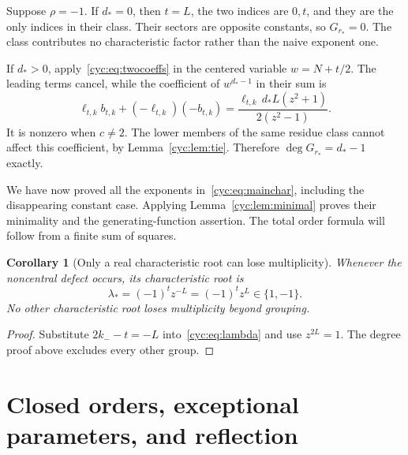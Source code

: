\documentclass[11pt,a4paper]{article}
\numberwithin{equation}{section}
\newtheorem{corollary}[theorem]{Corollary}
\theoremstyle{definition}
\theoremstyle{remark}
\begin{document}
Suppose $\rho=-1$.  If $d_*=0$, then $t=L$, the two indices are
$0,t$, and they are the only indices in their class.  Their sectors
are opposite constants, so $G_{r_*}=0$.  The class contributes no
characteristic factor rather than the naive exponent one.

If $d_*>0$, apply~\eqref{cyc:eq:twocoeffs} in the centered variable
$w=N+t/2$.  The leading terms cancel, while the coefficient of
$w^{d_*-1}$ in their sum is
\begin{equation}\label{cyc:eq:nextsurvives}
 \ell_{t,k}b_{t,k}+(-\ell_{t,k})(-b_{t,k})
 =\frac{\ell_{t,k}\,d_*L(z^2+1)}{2(z^2-1)}.
\end{equation}
It is nonzero when $c\ne2$.  The lower members of the same residue
class cannot affect this coefficient, by Lemma~\ref{cyc:lem:tie}.
Therefore $\deg G_{r_*}=d_*-1$ exactly.

We have now proved all the exponents in~\eqref{cyc:eq:mainchar}, including
the disappearing constant case.  Applying Lemma~\ref{cyc:lem:minimal}
proves their minimality and the generating-function assertion.  The
total order formula will follow from a finite sum of squares.

\begin{corollary}[Only a real characteristic root can lose multiplicity]
\label{cyc:cor:realdefect}
Whenever the noncentral defect occurs, its characteristic root is
\begin{equation}\label{cyc:eq:defectroot}
 \lambda_*=(-1)^t z^{-L}=(-1)^t z^L\in\{1,-1\}.
\end{equation}
No other characteristic root loses multiplicity beyond grouping.
\end{corollary}
\begin{proof}
Substitute $2k_--t=-L$ into~\eqref{cyc:eq:lambda} and use $z^{2L}=1$.
The degree proof above excludes every other group.
\end{proof}

\section{Closed orders, exceptional parameters, and reflection}\label{cyc:sec:orders}
\end{document}
